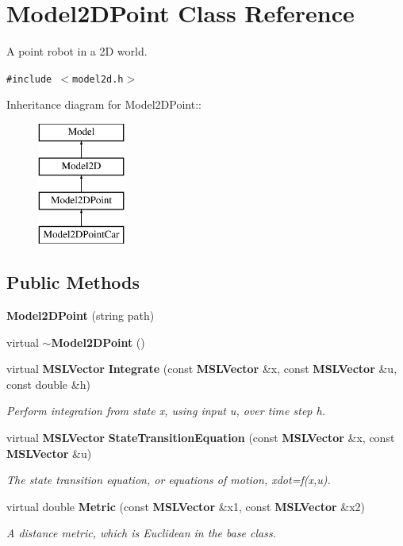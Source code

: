 \section{Model2DPoint  Class Reference}
\label{class_Model2DPoint}
A point robot in a 2D world. 


{\tt \#include $<$model2d.h$>$}

Inheritance diagram for Model2DPoint::\begin{figure}[H]
\begin{center}
\leavevmode
\includegraphics[height=4cm]{class_Model2DPoint}
\end{center}
\end{figure}
\subsection*{Public Methods}
\begin{CompactItemize}
\item 
{\bf Model2DPoint} (string path)
\item 
virtual {\bf $\sim$Model2DPoint} ()
\item 
virtual {\bf MSLVector} {\bf Integrate} (const {\bf MSLVector} \&x, const {\bf MSLVector} \&u, const double \&h)
\begin{CompactList}\small\item\em Perform integration from state x, using input u, over time step h.\item\end{CompactList}\item 
virtual {\bf MSLVector} {\bf State\-Transition\-Equation} (const {\bf MSLVector} \&x, const {\bf MSLVector} \&u)
\begin{CompactList}\small\item\em The state transition equation, or equations of motion, xdot=f(x,u).\item\end{CompactList}\item 
virtual double {\bf Metric} (const {\bf MSLVector} \&x1, const {\bf MSLVector} \&x2)
\begin{CompactList}\small\item\em A distance metric, which is Euclidean in the base class.\item\end{CompactList}\end{CompactItemize}


